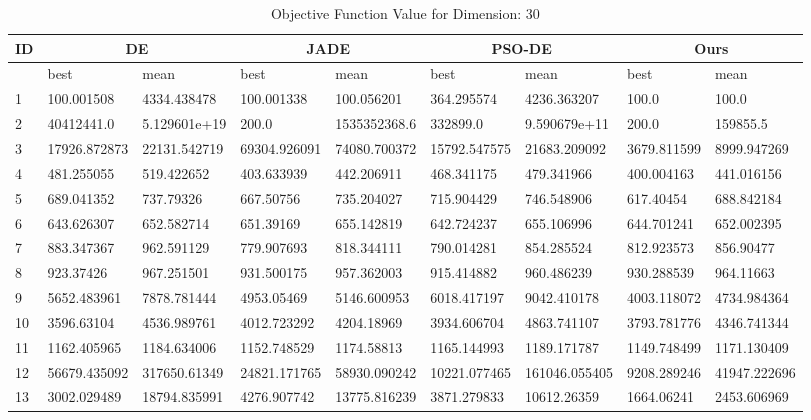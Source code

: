 \begin{table}
\centering
\caption{Objective Function Value for Dimension: 30}
 \begin{tabular}{|p{0.8cm}|p{1.6cm}|p{1.6cm}|p{1.6cm}|p{1.6cm}|p{1.6cm}|p{1.6cm}|p{1.6cm}|p{1.6cm}|} 
 \hline
 ID & \multicolumn{2}{c|}{DE} & \multicolumn{2}{c|}{JADE} & \multicolumn{2}{c|}{PSO-DE} & \multicolumn{2}{c|}{Ours} \\
 \hline
    & best & mean & best & mean & best & mean & best & mean \\ [0.5ex] 
 \hline
1  & 100.001508 & 4334.438478 & 100.001338 & 100.056201 & 364.295574 & 4236.363207 & 100.0 & 100.0 \\ 
 \hline
2  & 40412441.0 & 5.129601e+19 & 200.0 & 1535352368.6 & 332899.0 & 9.590679e+11 & 200.0 & 159855.5 \\ 
 \hline
3  & 17926.872873 & 22131.542719 & 69304.926091 & 74080.700372 & 15792.547575 & 21683.209092 & 3679.811599 & 8999.947269 \\ 
 \hline
4  & 481.255055 & 519.422652 & 403.633939 & 442.206911 & 468.341175 & 479.341966 & 400.004163 & 441.016156 \\ 
 \hline
5  & 689.041352 & 737.79326 & 667.50756 & 735.204027 & 715.904429 & 746.548906 & 617.40454 & 688.842184 \\ 
 \hline
6  & 643.626307 & 652.582714 & 651.39169 & 655.142819 & 642.724237 & 655.106996 & 644.701241 & 652.002395 \\ 
 \hline
7  & 883.347367 & 962.591129 & 779.907693 & 818.344111 & 790.014281 & 854.285524 & 812.923573 & 856.90477 \\ 
 \hline
8  & 923.37426 & 967.251501 & 931.500175 & 957.362003 & 915.414882 & 960.486239 & 930.288539 & 964.11663 \\ 
 \hline
9  & 5652.483961 & 7878.781444 & 4953.05469 & 5146.600953 & 6018.417197 & 9042.410178 & 4003.118072 & 4734.984364 \\ 
 \hline
10  & 3596.63104 & 4536.989761 & 4012.723292 & 4204.18969 & 3934.606704 & 4863.741107 & 3793.781776 & 4346.741344 \\ 
 \hline
11  & 1162.405965 & 1184.634006 & 1152.748529 & 1174.58813 & 1165.144993 & 1189.171787 & 1149.748499 & 1171.130409 \\ 
 \hline
12  & 56679.435092 & 317650.61349 & 24821.171765 & 58930.090242 & 10221.077465 & 161046.055405 & 9208.289246 & 41947.222696 \\ 
 \hline
13  & 3002.029489 & 18794.835991 & 4276.907742 & 13775.816239 & 3871.279833 & 10612.26359 & 1664.06241 & 2453.606969 \\ 

\end{tabular}
\end{table}
